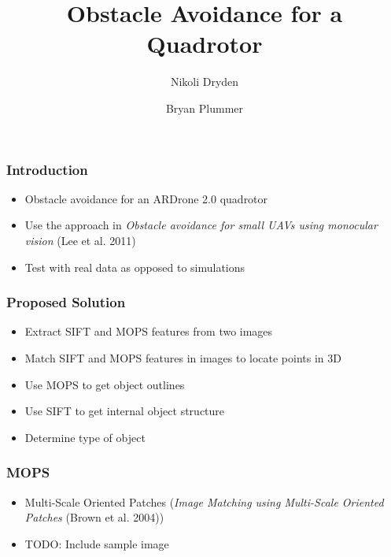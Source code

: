 \documentclass[xcolor=x11names,compress,t]{beamer}
\renewcommand{\(}{\begin{columns}}
\renewcommand{\)}{\end{columns}}
\newcommand{\<}[1]{\begin{column}{#1}}
\renewcommand{\>}{\end{column}}
\begin{document}
\abovedisplayskip=6pt

%
%

\begin{frame}
\title{Obstacle Avoidance for a Quadrotor}
\author{Nikoli Dryden \and Bryan Plummer}
\date{}
\titlepage
\end{frame}


\begin{frame}
  \frametitle{Introduction}
  \begin{itemize}
  \item Obstacle avoidance for an ARDrone 2.0 quadrotor
  \item Use the approach in \emph{Obstacle avoidance for small UAVs using monocular vision} (Lee et al. 2011)
  \item Test with real data as opposed to simulations
  \end{itemize}
\end{frame}

\begin{frame}
  \frametitle{Proposed Solution}
  \begin{itemize}
  \item Extract SIFT and MOPS features from two images
  \item Match SIFT and MOPS features in images to locate points in 3D
  \item Use MOPS to get object outlines
  \item Use SIFT to get internal object structure
  \item Determine type of object
  \end{itemize}
\end{frame}

\begin{frame}
  \frametitle{MOPS}
  \begin{itemize}
  \item Multi-Scale Oriented Patches (\emph{Image Matching using Multi-Scale Oriented Patches} (Brown et al. 2004))
  \item TODO: Include sample image
  \end{itemize}
\end{frame}
\end{document}
